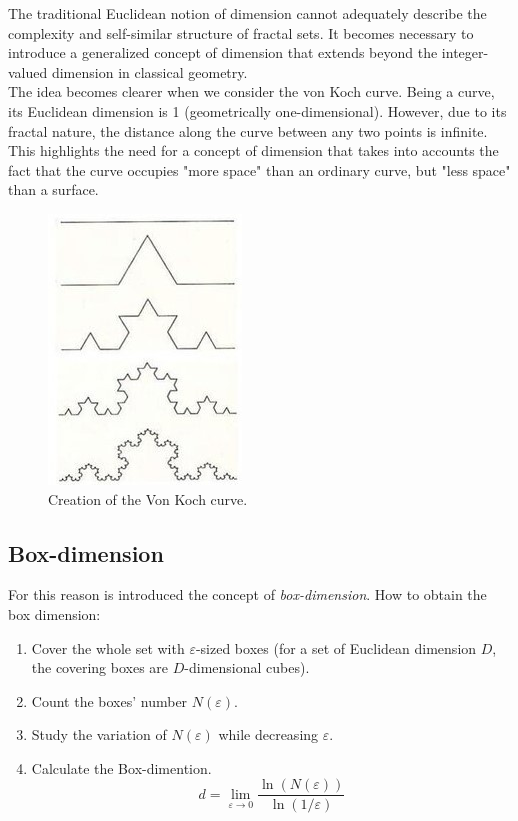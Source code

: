 The traditional Euclidean notion of dimension cannot adequately describe the complexity and self-similar structure of fractal sets. It becomes necessary to introduce a generalized concept of dimension that extends beyond the integer-valued dimension in classical geometry.\\

The idea becomes clearer when we consider the von Koch curve. Being a curve, its Euclidean dimension is 1 (geometrically one-dimensional). However, due to its fractal nature, the distance along the curve between any two points is infinite.
This highlights the need for a concept of dimension that takes into accounts the fact that the curve occupies "more space" than an ordinary curve, but "less space" than a surface.
\begin{figure}[H]
        \centering
        \includegraphics[width=0.35\linewidth]{img/curva di Van Koch.jpg}
        \caption{Creation of the Von Koch curve.}
\end{figure}

\subsection{Box-dimension} \label{app:C_Box_dimension}
For this reason is introduced the concept of \textit{box-dimension}. How to obtain the box dimension:
\begin{enumerate}[label=\roman*)]
    \item Cover the whole set with $\varepsilon$-sized boxes (for a set of Euclidean dimension $D$, the covering boxes are $D$-dimensional cubes).
    \item Count the boxes' number $N(\varepsilon)$.
    \item Study the variation of $N(\varepsilon)$ while decreasing $\varepsilon$.
    \item Calculate the Box-dimention.
\begin{equation*}
    d=\lim_{\varepsilon \rightarrow 0} \frac{\ln(N(\varepsilon))}{\ln(1/\varepsilon)}    
\end{equation*}

\end{enumerate}

